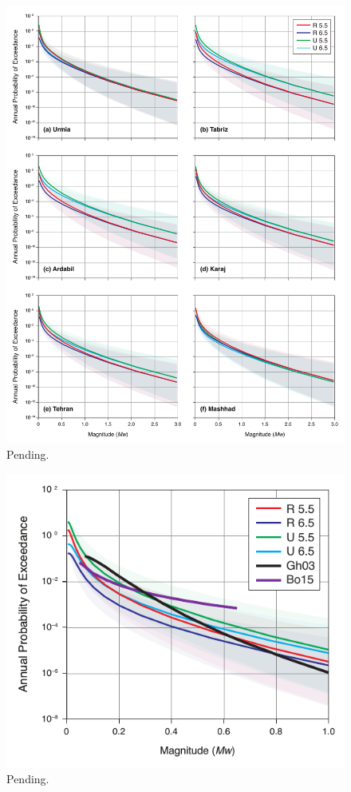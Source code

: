 \begin{figure}[th!]
    \centering
    \includegraphics[width=\textwidth]{figures/pdf/figure-12} 
    \caption{Pending.}%
    \label{fig:hazardcurve}
\end{figure}

\begin{figure}[t]
    \centering
    \includegraphics[width=\columnwidth]{figures/pdf/figure-13} 
    \caption{Pending.}%
    \label{fig:hazardcurve}
\end{figure}

